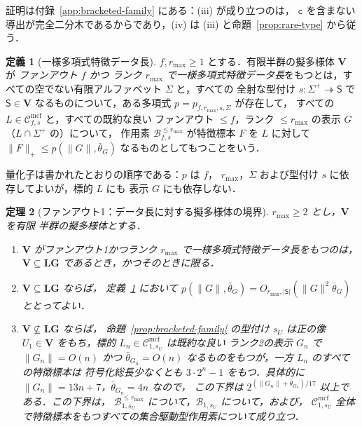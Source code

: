 \documentclass[11pt,a4paper]{ltjsarticle}
\numberwithin{equation}{section}
\theoremstyle{plain}
\newtheorem{theorem}{定理}[section]
\theoremstyle{definition}
\newtheorem{definition}[theorem]{定義}
\theoremstyle{remark}
\newcommand{\Cmcf}[2]{\mathcal{C}^{\mathrm{mcf}}_{#1,#2}}
\theoremstyle{plain}
\begin{document}
証明は付録~\ref{app:bracketed-family} にある：(iii) が成り立つのは，
$\mathtt c$ を含まない導出が完全二分木であるからであり，(iv) は
(iii) と命題~\ref{prop:rare-type} から従う．


\begin{definition}[一様多項式特徴データ長]
\label{def:uniform-polydata}
$f,r_{\max}\ge1$ とする．有限半群の擬多様体 $\mathbf V$ が
\emph{ファンアウト $f$ かつ
ランク $r_{\max}$ で一様多項式特徴データ長}をもつとは，すべての空でない有限アルファベット $\Sigma$ と，すべての
全射な型付け $s:\Sigma^+\twoheadrightarrow\mathsf S$ で
$\mathsf S\in\mathbf V$ なるものについて，ある多項式 $p=p_{f,r_{\max},s,\Sigma}$ が存在して，
すべての $L\in\Cmcf{f}{s}$ と，すべての既約な良い
ファンアウト $\le f$，ランク $\le r_{\max}$ の表示 $G$（$L\cap\Sigma^+$ の）について，
作用素 $\mathcal B^{\le r_{\max}}_{f,s}$ が特徴標本
$F$ を $L$ に対して $\|F\|_+\le p(\|G\|,\bar\theta_G)$ なるものとしてもつことをいう．
\end{definition}

量化子は書かれたとおりの順序である：$p$ は $f$，
$r_{\max}$，$\Sigma$ および型付け $s$ に依存してよいが，標的 $L$ にも
表示 $G$ にも依存しない．

\begin{theorem}[ファンアウト1：データ長に対する擬多様体の境界]
\label{thm:fanout-one-data}
$r_{\max}\ge2$ とし，$\mathbf V$ を有限
半群の擬多様体とする．
\begin{enumerate}[label=\textup{(\roman*)},leftmargin=*]
\item $\mathbf V$ がファンアウト1かつランク $r_{\max}$ で一様多項式特徴データ長をもつのは，
$\mathbf V\subseteq\mathbf{LG}$ であるとき，かつそのときに限る．
\item $\mathbf V\subseteq\mathbf{LG}$ ならば，
定義~\ref{def:uniform-polydata} において
$p(\|G\|,\bar\theta_G)=O_{r_{\max},|\mathsf S|}(\|G\|^2\bar\theta_G)$ ととってよい．
\item $\mathbf V\not\subseteq\mathbf{LG}$ ならば，
命題~\ref{prop:bracketed-family} の型付け $s_U$ は正の像
$U_1\in\mathbf V$ をもち，標的 $L_n\in\Cmcf{1}{s_U}$ は既約な良い
ランク2の表示 $G_n$ で $\|G_n\|=O(n)$ かつ
$\bar\theta_{G_n}=O(n)$ なるものをもつが，一方 $L_n$ のすべての特徴標本は
符号化総長少なくとも $3\cdot2^n-1$ をもつ．具体的に
$\|G_n\|=13n+7$，$\bar\theta_{G_n}=4n$ なので，
この下界は $2^{(\|G_n\|+\bar\theta_{G_n})/17}$ 以上である．この下界は，
$\mathcal B^{\le r_{\max}}_{1,s_U}$ について，$\mathcal B_{1,s_U}$ について，および，
$\Cmcf{1}{s_U}$ 全体で特徴標本をもつすべての集合駆動型作用素について成り立つ．
\end{enumerate}
\end{theorem}
\end{document}
